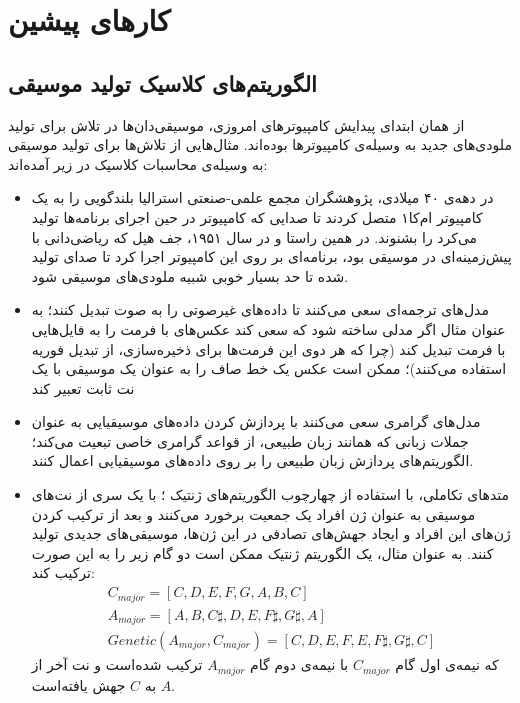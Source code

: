 \chapter{کارهای پیشین}

\section{الگوریتم‌های کلاسیک تولید موسیقی}

از همان ابتدای پیدایش کامپیوترهای امروزی، موسیقی‌دان‌ها در تلاش برای تولید ملودی‌های جدید به وسیله‌ی کامپیوترها بوده‌اند.
مثال‌هایی از تلاش‌ها برای تولید موسیقی به وسیله‌ی محاسبات کلاسیک در زیر آمده‌اند:

\begin{itemize}
    \item 
    در دهه‌ی ۴۰ میلادی، پژوهشگران مجمع علمی-صنعتی استرالیا
بلندگویی را به یک کامپیوتر ام‌کا۱
متصل کردند تا صدایی که کامپیوتر در حین اجرای برنامه‌ها تولید می‌کرد را بشنوند. در همین راستا و در سال ۱۹۵۱، جف هیل
که ریاضی‌دانی با پیش‌زمینه‌ای در موسیقی بود، برنامه‌ای بر روی این کامپیوتر اجرا کرد تا صدای تولید شده تا حد بسیار خوبی شبیه ملودی‌های موسیقی شود.
\cite{CSIR_music}

\item
مدل‌های ترجمه‌ای
سعی می‌کنند تا داده‌های غیرصوتی را به صوت تبدیل کنند؛ به عنوان مثال اگر مدلی ساخته شود که سعی کند عکس‌های با فرمت 
را به فایل‌هایی با فرمت
تبدیل کند (چرا که هر دوی این فرمت‌ها برای ذخیره‌سازی، از تبدیل فوریه استفاده می‌کنند)؛ ممکن است عکس یک خط صاف را به عنوان یک موسیقی با یک نت ثابت تعبیر کند

\item
مدل‌های گرامری
سعی می‌کنند با پردازش کردن داده‌های موسیقیایی به عنوان جملات زبانی که همانند زبان طبیعی، از قواعد گرامری خاصی تبعیت می‌کند؛ الگوریتم‌های پردازش زبان طبیعی
را بر روی داده‌های موسیقیایی اعمال کنند.

\item
متدهای تکاملی، با استفاده از چهارچوب الگوریتم‌های ژنتیک
؛ با یک سری از نت‌های موسیقی به عنوان ژن افراد یک جمعیت برخورد می‌کنند و بعد از ترکیب کردن ژن‌های این افراد و ایجاد جهش‌های تصادفی در این ژن‌ها، موسیقی‌های جدیدی تولید کنند.
به عنوان مثال، یک الگوریتم ژنتیک ممکن است دو گام زیر را به این صورت ترکیب کند:
\begin{equation}
\begin{gathered}
    C_{major} = [C, D, E, F, G, A, B, C]\\[3pt]
    A_{major} = [A, B, C\sharp, D, E, F\sharp, G\sharp, A] \\
    Genetic(A_{major}, C_{major}) = [C, D, E, F, E, F\sharp, G\sharp, C] 
\end{gathered}
\end{equation}
که نیمه‌ی اول گام 
$C_{major}$
با نیمه‌ی دوم گام
$A_{major}$
ترکیب شده‌است و نت آخر از 
$A$
به
$C$
جهش یافته‌است.


\end{itemize}
